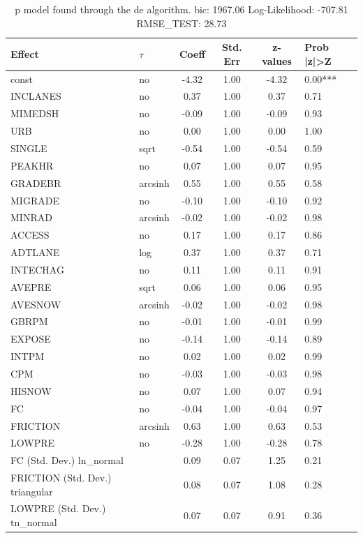 \begin{table}
	\caption{p model found through the de algorithm. bic: 1967.06 Log-Likelihood: -707.81 RMSE_TEST: 28.73}
	\begin{center}
		\begin{tabular}{|l|l|c|c|c|l|}
			\hline
			Effect & $\tau$ & Coeff & Std. Err & z-values & Prob |z|>Z \\
			\hline
			const & no & -4.32 & 1.00 & -4.32 & 0.00*** \\
			\hline
			INCLANES & no & 0.37 & 1.00 & 0.37 & 0.71 \\
			\hline
			MIMEDSH & no & -0.09 & 1.00 & -0.09 & 0.93 \\
			\hline
			URB & no & 0.00 & 1.00 & 0.00 & 1.00 \\
			\hline
			SINGLE & sqrt & -0.54 & 1.00 & -0.54 & 0.59 \\
			\hline
			PEAKHR & no & 0.07 & 1.00 & 0.07 & 0.95 \\
			\hline
			GRADEBR & arcsinh & 0.55 & 1.00 & 0.55 & 0.58 \\
			\hline
			MIGRADE & no & -0.10 & 1.00 & -0.10 & 0.92 \\
			\hline
			MINRAD & arcsinh & -0.02 & 1.00 & -0.02 & 0.98 \\
			\hline
			ACCESS & no & 0.17 & 1.00 & 0.17 & 0.86 \\
			\hline
			ADTLANE & log & 0.37 & 1.00 & 0.37 & 0.71 \\
			\hline
			INTECHAG & no & 0.11 & 1.00 & 0.11 & 0.91 \\
			\hline
			AVEPRE & sqrt & 0.06 & 1.00 & 0.06 & 0.95 \\
			\hline
			AVESNOW & arcsinh & -0.02 & 1.00 & -0.02 & 0.98 \\
			\hline
			GBRPM & no & -0.01 & 1.00 & -0.01 & 0.99 \\
			\hline
			EXPOSE & no & -0.14 & 1.00 & -0.14 & 0.89 \\
			\hline
			INTPM & no & 0.02 & 1.00 & 0.02 & 0.99 \\
			\hline
			CPM & no & -0.03 & 1.00 & -0.03 & 0.98 \\
			\hline
			HISNOW & no & 0.07 & 1.00 & 0.07 & 0.94 \\
			\hline
			FC & no & -0.04 & 1.00 & -0.04 & 0.97 \\
			\hline
			FRICTION & arcsinh & 0.63 & 1.00 & 0.63 & 0.53 \\
			\hline
			LOWPRE & no & -0.28 & 1.00 & -0.28 & 0.78 \\
			\hline
			FC (Std. Dev.) ln_normal &  & 0.09 & 0.07 & 1.25 & 0.21 \\
			\hline
			FRICTION (Std. Dev.) triangular &  & 0.08 & 0.07 & 1.08 & 0.28 \\
			\hline
			LOWPRE (Std. Dev.) tn_normal &  & 0.07 & 0.07 & 0.91 & 0.36 \\
			\hline
		\end{tabular}
	\end{center}
\end{table}